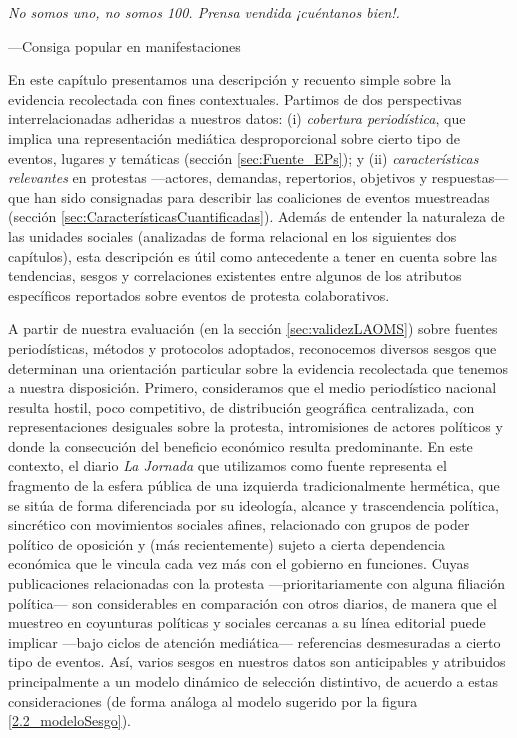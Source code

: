 \documentclass[letterpaper, 11pt]{book}
\theoremstyle{definition}
\theoremstyle{remark}
\begin{document}
\epigraph{\itshape No somos uno, no somos 100. Prensa vendida ¡cuéntanos bien!.}{---Consiga popular en manifestaciones}


\begingroup
\small
    En este capítulo presentamos una descripción y recuento simple sobre la evidencia recolectada con fines contextuales. 
    Partimos de dos perspectivas interrelacionadas adheridas a nuestros datos: 
    (i) \emph{cobertura periodística}, que implica una representación mediática desproporcional sobre cierto tipo de eventos, lugares y temáticas (sección \ref{sec:Fuente_EPs}); 
    y (ii) \emph{características relevantes} en protestas ---actores, demandas, repertorios, objetivos y respuestas--- que han sido consignadas para describir las coaliciones de eventos muestreadas (sección \ref{sec:CaracterísticasCuantificadas}). 
    Además de entender la naturaleza de las unidades sociales (analizadas de forma relacional en los siguientes dos capítulos), esta descripción es útil como antecedente a tener en cuenta sobre las tendencias, sesgos y correlaciones existentes entre algunos de los atributos específicos reportados sobre eventos de protesta colaborativos.
\vspace{2em}
\endgroup



A partir de nuestra evaluación (en la sección \ref{sec:validezLAOMS}) sobre fuentes periodísticas, métodos y protocolos adoptados, reconocemos diversos sesgos que determinan una orientación particular sobre la evidencia recolectada que tenemos a nuestra disposición. 
Primero, consideramos que el medio periodístico nacional resulta hostil, poco competitivo, de distribución geográfica centralizada, con representaciones desiguales sobre la protesta, intromisiones de actores políticos y donde la consecución del beneficio económico resulta predominante. 
En este contexto, el diario \emph{La Jornada} que utilizamos como fuente representa el fragmento de la esfera pública de una izquierda tradicionalmente hermética, que se sitúa de forma diferenciada por su ideología, alcance y trascendencia política, sincrético con movimientos sociales afines, relacionado con grupos de poder político de oposición y (más recientemente) sujeto a cierta dependencia económica que le vincula cada vez más con el gobierno en funciones. 
Cuyas publicaciones relacionadas con la protesta ---prioritariamente con alguna filiación política--- son considerables en comparación con otros diarios, de manera que el muestreo en coyunturas políticas y sociales cercanas a su línea editorial puede implicar ---bajo ciclos de atención mediática--- referencias desmesuradas a cierto tipo de eventos. 
Así, varios sesgos en nuestros datos son anticipables y atribuidos principalmente a un modelo dinámico de selección distintivo, de acuerdo a estas consideraciones (de forma análoga al modelo sugerido por la figura \ref{2.2_modeloSesgo}). 
\end{document}
